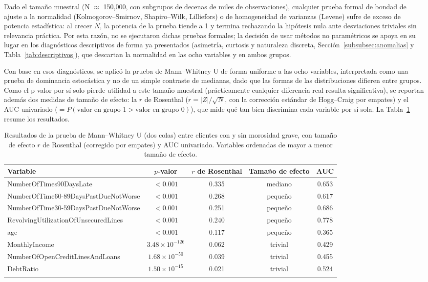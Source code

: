 \documentclass[pdflatex,sn-mathphys-num]{sn-jnl}
\begin{document}
Dado el tamaño muestral (N $\approx$ 150{,}000, con subgrupos de decenas de miles de observaciones), cualquier prueba formal de bondad de ajuste a la normalidad (Kolmogorov--Smirnov, Shapiro--Wilk, Lilliefors) o de homogeneidad de varianzas (Levene) sufre de exceso de potencia estadística: al crecer $N$, la potencia de la prueba tiende a 1 y termina rechazando la hipótesis nula ante desviaciones triviales sin relevancia práctica. Por esta razón, no se ejecutaron dichas pruebas formales; la decisión de usar métodos no paramétricos se apoya en su lugar en los diagnósticos descriptivos de forma ya presentados (asimetría, curtosis y naturaleza discreta, Sección~\ref{subsubsec:anomalias} y Tabla~\ref{tab:descriptivos}), que descartan la normalidad en las ocho variables y en ambos grupos.

Con base en esos diagnósticos, se aplicó la prueba de Mann--Whitney U de forma uniforme a las ocho variables, interpretada como una prueba de dominancia estocástica y no de un simple contraste de medianas, dado que las formas de las distribuciones difieren entre grupos. Como el p-valor por sí solo pierde utilidad a este tamaño muestral (prácticamente cualquier diferencia real resulta significativa), se reportan además dos medidas de tamaño de efecto: la $r$ de Rosenthal ($r = |Z|/\sqrt{N}$, con la corrección estándar de Hogg--Craig por empates) y el AUC univariado ($= P(\text{valor en grupo 1} > \text{valor en grupo 0})$), que mide qué tan bien discrimina cada variable por sí sola. La Tabla~\ref{tab:mannwhitney} resume los resultados.

\begin{table}[h]
\centering
\caption{Resultados de la prueba de Mann--Whitney U (dos colas) entre clientes con y sin morosidad grave, con tamaño de efecto $r$ de Rosenthal (corregido por empates) y AUC univariado. Variables ordenadas de mayor a menor tamaño de efecto.}\label{tab:mannwhitney}
\small
\begin{tabular}{@{}lcccc@{}}
\toprule
Variable & $p$-valor & $r$ de Rosenthal & Tamaño de efecto & AUC \\
\midrule
NumberOfTimes90DaysLate & $<0.001$ & 0.335 & mediano & 0.653 \\
NumberOfTime60-89DaysPastDueNotWorse & $<0.001$ & 0.268 & pequeño & 0.617 \\
NumberOfTime30-59DaysPastDueNotWorse & $<0.001$ & 0.251 & pequeño & 0.686 \\
RevolvingUtilizationOfUnsecuredLines & $<0.001$ & 0.240 & pequeño & 0.778 \\
age & $<0.001$ & 0.117 & pequeño & 0.365 \\
MonthlyIncome & $3.48\times10^{-126}$ & 0.062 & trivial & 0.429 \\
NumberOfOpenCreditLinesAndLoans & $1.68\times10^{-50}$ & 0.039 & trivial & 0.455 \\
DebtRatio & $1.50\times10^{-15}$ & 0.021 & trivial & 0.524 \\
\botrule
\end{tabular}
\end{table}
\end{document}

